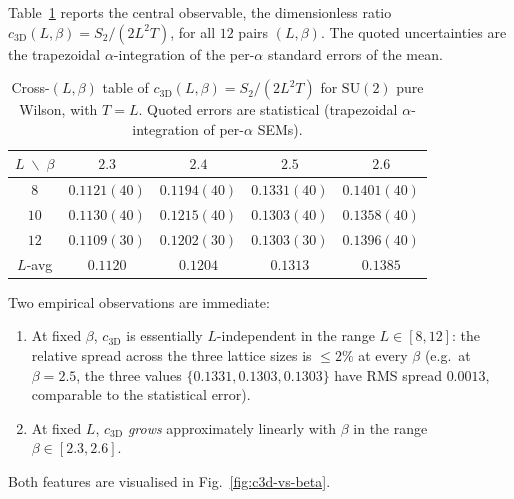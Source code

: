 \documentclass[11pt,a4paper]{article}
\theoremstyle{definition}
\newcommand{\SUtwo}{\mathrm{SU}(2)}
\newcommand{\threeD}{{3\text{D}}}
\begin{document}
Table~\ref{tab:c3D} reports the central observable, the
dimensionless ratio $c_{\threeD}(L,\beta) = S_{2}/(2L^{2}T)$, for all
$12$ pairs $(L,\beta)$. The quoted uncertainties are the trapezoidal
$\alpha$-integration of the per-$\alpha$ standard errors of the mean.

\begin{table}[tb]
\centering
\caption{Cross-$(L,\beta)$ table of $c_{\threeD}(L,\beta) =
S_{2}/(2L^{2}T)$ for $\SUtwo$ pure Wilson, with $T = L$. Quoted
errors are statistical (trapezoidal $\alpha$-integration of
per-$\alpha$ SEMs).}
\label{tab:c3D}
\renewcommand{\arraystretch}{1.15}
\begin{tabular}{ccccc}
\toprule
$L \;\backslash\; \beta$ & $2.3$ & $2.4$ & $2.5$ & $2.6$ \\
\midrule
$8$  & $0.1121(40)$ & $0.1194(40)$ & $0.1331(40)$ & $0.1401(40)$ \\
$10$ & $0.1130(40)$ & $0.1215(40)$ & $0.1303(40)$ & $0.1358(40)$ \\
$12$ & $0.1109(30)$ & $0.1202(30)$ & $0.1303(30)$ & $0.1396(40)$ \\
\midrule
$L$-avg & $0.1120$ & $0.1204$ & $0.1313$ & $0.1385$ \\
\bottomrule
\end{tabular}
\end{table}

Two empirical observations are immediate:
\begin{enumerate}[leftmargin=*]
\item At fixed $\beta$, $c_{\threeD}$ is essentially $L$-independent
      in the range $L\in[8,12]$: the relative spread across the three
      lattice sizes is $\le 2\%$ at every $\beta$ (e.g.\ at $\beta =
      2.5$, the three values $\{0.1331,0.1303,0.1303\}$ have RMS
      spread $0.0013$, comparable to the statistical error).
\item At fixed $L$, $c_{\threeD}$ \emph{grows} approximately linearly
      with $\beta$ in the range $\beta\in[2.3,2.6]$.
\end{enumerate}
Both features are visualised in Fig.~\ref{fig:c3d-vs-beta}.
\end{document}
